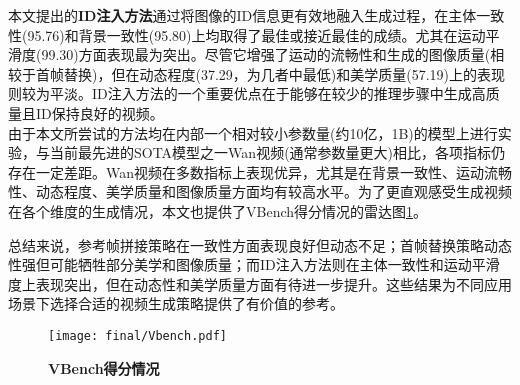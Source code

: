 本文提出的\textbf{ID注入方法}通过将图像的ID信息更有效地融入生成过程，在主体一致性(95.76)和背景一致性(95.80)上均取得了最佳或接近最佳的成绩。尤其在运动平滑度(99.30)方面表现最为突出。尽管它增强了运动的流畅性和生成的图像质量(相较于首帧替换)，但在动态程度(37.29，为几者中最低)和美学质量(57.19)上的表现则较为平淡。ID注入方法的一个重要优点在于能够在较少的推理步骤中生成高质量且ID保持良好的视频。\\
由于本文所尝试的方法均在内部一个相对较小参数量(约10亿，1B)的模型上进行实验，与当前最先进的SOTA模型之一Wan视频\cite{wan2025}(通常参数量更大)相比，各项指标仍存在一定差距。Wan视频在多数指标上表现优异，尤其是在背景一致性、运动流畅性、动态程度、美学质量和图像质量方面均有较高水平。为了更直观感受生成视频在各个维度的生成情况，本文也提供了VBench得分情况的雷达图\ref{fig:vbench}。

总结来说，参考帧拼接策略在一致性方面表现良好但动态不足；首帧替换策略动态性强但可能牺牲部分美学和图像质量；而ID注入方法则在主体一致性和运动平滑度上表现突出，但在动态性和美学质量方面有待进一步提升。这些结果为不同应用场景下选择合适的视频生成策略提供了有价值的参考。


\begin{figure}[htbp]
    \centering
    \texttt{[image: final/Vbench.pdf]}
    \caption{\textbf{VBench得分情况}}
    \label{fig:vbench}
\end{figure}

